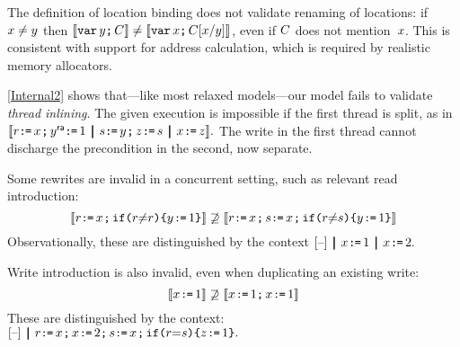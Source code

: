 

The definition of location binding does not validate renaming of locations:
if $x\neq y$ then
$\llbracket\texttt{var}\,y\texttt{;}\,\allowbreak C\rrbracket\neq\llbracket\texttt{var}\,x\texttt{;}\,\allowbreak C[x/y]\rrbracket$, even
if $C$ does not mention~$x$.  This is consistent with support for
address calculation, which is required by realistic memory allocators.

\ref{Internal2} shows that---like most relaxed models---our model
fails to validate \emph{thread inlining}.  The given execution is impossible
if the first thread is split, as in
\begin{math}
  \sem{\PR{x}{\aReg}\SEMI
    \PW[\mRA]{y}{1}\PAR
    \PR{y}{\bReg}\SEMI
    \PW{z}{\bReg}
    \PAR
    \PW{x}{z}}.
\end{math}
The write in the first thread cannot discharge the precondition in the
second, now separate.


Some rewrites are invalid in a concurrent setting, such as
relevant read introduction:
\begin{displaymath}
  \sem{\PR{\aLoc}{\aReg} \SEMI \IF{\aReg {\neq} \aReg} \THEN \PW{y}{1} \FI}
  \not\supseteq
  \sem{\PR{\aLoc}{\aReg} \SEMI \PR{\aLoc}{\bReg}  \SEMI \IF{\aReg {\neq}\bReg} \THEN \PW{y}{1} \FI}
\end{displaymath}
Observationally, these are distinguished by the context %
\begin{math}
  \hole{} \PAR \PW{x}{1}\PAR \PW{x}{2}.
\end{math}


Write introduction is also invalid, even when duplicating an existing write:
\begin{displaymath}
  \sem{\PW{\aLoc}{1}} 
  \not\supseteq
  \sem{\PW{\aLoc}{1} \SEMI \PW{\aLoc}{1}}
\end{displaymath}
These are distinguished by the context:
\begin{math}
  \hole{} \PAR
  \PR{x}{r} \SEMI
  \PW{x}{2} \SEMI
  \PR{x}{s}\SEMI
  \IF{\aReg {=} \bReg} \THEN \PW{\cLoc}{1} \FI.
\end{math}

